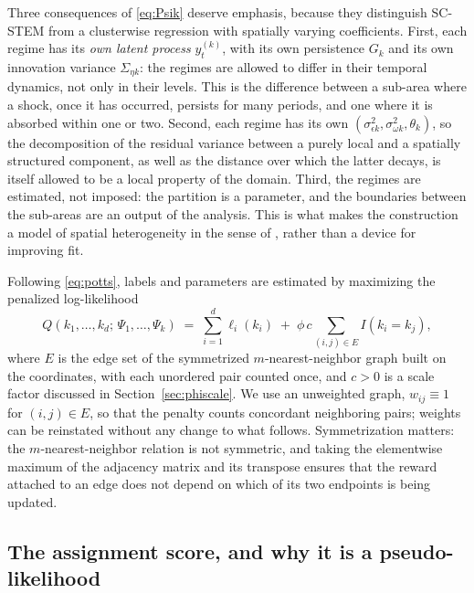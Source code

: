 Three consequences of \eqref{eq:Psik} deserve emphasis, because they distinguish SC-STEM from a clusterwise regression with spatially varying coefficients. First, each regime has its \emph{own latent process} $y^{(k)}_t$, with its own persistence $G_k$ and its own innovation variance $\Sigma_{\eta k}$: the regimes are allowed to differ in their temporal dynamics, not only in their levels. This is the difference between a sub-area where a shock, once it has occurred, persists for many periods, and one where it is absorbed within one or two. Second, each regime has its own $(\sigma^2_{\epsilon k}, \sigma^2_{\omega k}, \theta_k)$, so the decomposition of the residual variance between a purely local and a spatially structured component, as well as the distance over which the latter decays, is itself allowed to be a local property of the domain. Third, the regimes are estimated, not imposed: the partition is a parameter, and the boundaries between the sub-areas are an output of the analysis. This is what makes the construction a model of spatial heterogeneity in the sense of \citet{Goodchild2004}, rather than a device for improving fit.

Following \eqref{eq:potts}, labels and parameters are estimated by maximizing the penalized log-likelihood
\begin{equation}\label{eq:Q}
  Q\!\left(k_1,\ldots,k_d;\, \Psi_1,\ldots,\Psi_k\right)
  \;=\; \sum_{i=1}^{d} \ell_i(k_i)
  \;+\; \phi\, c \sum_{(i,j) \in E} I(k_i = k_j),
\end{equation}
where $E$ is the edge set of the symmetrized $m$-nearest-neighbor graph built on the coordinates, with each unordered pair counted once, and $c > 0$ is a scale factor discussed in Section~\ref{sec:phiscale}. We use an unweighted graph, $w_{ij} \equiv 1$ for $(i,j) \in E$, so that the penalty counts concordant neighboring pairs; weights can be reinstated without any change to what follows. Symmetrization matters: the $m$-nearest-neighbor relation is not symmetric, and taking the elementwise maximum of the adjacency matrix and its transpose ensures that the reward attached to an edge does not depend on which of its two endpoints is being updated.

\subsection{The assignment score, and why it is a pseudo-likelihood}\label{sec2:score}

